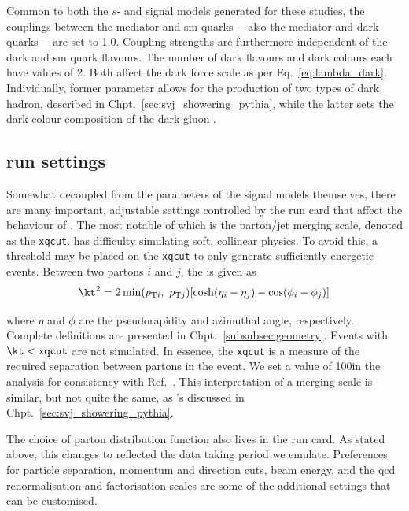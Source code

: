 Common to both the $s$- and \tchannel signal models generated for these studies, the couplings between the mediator and \acrshort{sm} quarks \gq---also the mediator and dark quarks \gqdark---are set to 1.0. Coupling strengths are furthermore independent of the dark and \acrshort{sm} quark flavours. The number of dark flavours \Nf and dark colours \Nc each have values of 2. Both affect the dark force scale as per Eq.~\ref{eq:lambda_dark}. Individually, former parameter allows for the production of two types of dark hadron, described in Chpt.~\ref{sec:svj_showering_pythia}, while the latter sets the dark colour composition of the dark gluon \Pgdark. 




\subsection{\texorpdfstring{\MADGRAPH}{MadGraph} run settings}
\label{subsec:svj_mg_run_settings}

Somewhat decoupled from the parameters of the signal models themselves, there are many important, adjustable settings controlled by the run card that affect the behaviour of \MADGRAPH. The most notable of which is the parton/\gls{jet} merging scale, denoted as the \texttt{xqcut}. \MADGRAPH has difficulty simulating soft, collinear physics. To avoid this, a threshold may be placed on the \texttt{xqcut} to only generate sufficiently energetic events. Between two partons $i$ and $j$, the \kt is given as
\begin{equation}
    \kt^2 = 2 \min(p_{\mathrm{T}i}, \ p_{\mathrm{T}j}) [\cosh(\eta_i - \eta_j) - \cos(\phi_i - \phi_j)]
    \label{eq:svj_mg_kt}
\end{equation}

where $\eta$ and $\phi$ are the pseudorapidity and azimuthal angle, respectively. Complete definitions are presented in Chpt.~\ref{subsubsec:geometry}. Events with $\kt < \texttt{xqcut}$ are not simulated. In essence, the \texttt{xqcut} is a measure of the required separation between partons in the event. We set a value of 100\GeV in the analysis for consistency with Ref.~. This interpretation of a merging scale is similar, but not quite the same, as \PYTHIA's discussed in Chpt.~\ref{sec:svj_showering_pythia}.

The choice of parton distribution function also lives in the run card. As stated above, this changes to reflected the data taking period we emulate. Preferences for particle separation, momentum and direction cuts, beam energy, and the \acrshort{qcd} renormalisation and factorisation scales are some of the additional settings that can be customised.


